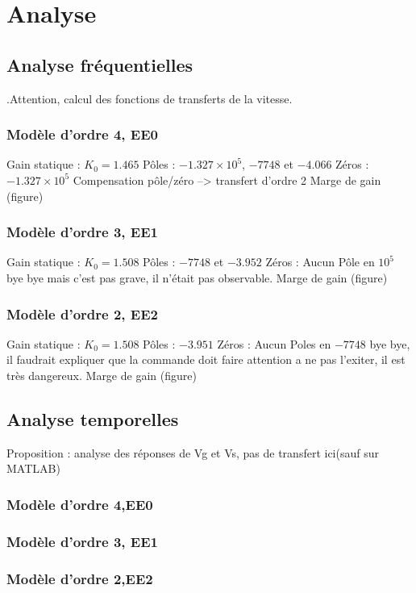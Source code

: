 \chapter{Analyse}
\label{chap:analyse}

\section{Analyse fréquentielles}.Attention, calcul des fonctions de transferts de la vitesse.
\subsection{Modèle d'ordre 4, EE0}

Gain statique : $K_0 = 1.465$
Pôles :  $-1.327\times 10^5$, $-7748$ et $-4.066$
Zéros : $-1.327\times  10^5$
Compensation pôle/zéro --> transfert d'ordre 2
Marge de gain (figure)


\subsection{Modèle d'ordre 3, EE1}
Gain statique : $K_0 = 1.508$
Pôles :  $-7748$ et $-3.952$
Zéros : Aucun
Pôle en $10^5$ bye bye mais c'est pas grave, il n'était pas observable.
Marge de gain (figure)

\subsection{Modèle d'ordre 2, EE2}
Gain statique : $K_0 = 1.508$
Pôles : $-3.951$
Zéros : Aucun
Poles en $-7748$ bye bye, il faudrait expliquer que la commande doit faire attention a ne pas l'exiter, il est très dangereux.
Marge de gain (figure)
 
\section{Analyse temporelles}
Proposition : analyse des réponses de Vg et Vs, pas de transfert ici(sauf sur MATLAB) 
\subsection{Modèle d'ordre 4,EE0}

\subsection{Modèle d'ordre 3, EE1}
\subsection{Modèle d'ordre 2,EE2}